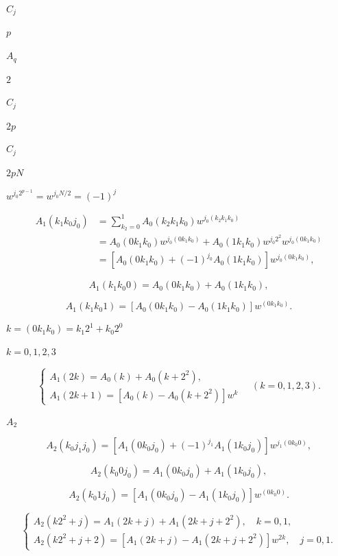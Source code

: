 \documentclass[UTF8,fontset=fandol,a4paper]{ctexart}
\begin{document}
\noindent $C_j$\par

\noindent $p$\par

\noindent $A_q$\par

\noindent $2$\par

\noindent $C_j$\par

\noindent $2p$\par

\noindent $C_j$\par

\noindent $2pN$\par

\noindent $w^{j_0 2^{p-1}}=w^{j_0N/2}=(-1)^j$\par

\[
\begin{aligned}
A_1(k_1k_0j_0)&=\sum_{k_2=0}^1A_0(k_2k_1k_0)w^{j_0(k_2k_1k_0)}\\
&=A_0(0k_1k_0)w^{j_0(0k_1k_0)}+A_0(1k_1k_0)w^{j_0 2^2}w^{j_0(0k_1k_0)}\\
&=[A_0(0k_1k_0)+(-1)^{j_0}A_0(1k_1k_0)]w^{j_0(0k_1k_0)},
\end{aligned}
\]

\[
A_1(k_1k_0 0)=A_0(0k_1k_0)+A_0(1k_1k_0),
\]

\[
A_1(k_1k_0 1)=[A_0(0k_1k_0)-A_0(1k_1k_0)]w^{(0k_1k_0)}.
\]

\noindent $k=(0k_1k_0)=k_1 2^1+k_0 2^0$\par

\noindent $k=0,1,2,3$\par

\[
\begin{cases}
A_1(2k)=A_0(k)+A_0(k+2^2),\\
A_1(2k+1)=[A_0(k)-A_0(k+2^2)]w^k
\end{cases}\quad(k=0,1,2,3).\tag{3.7.13}
\]

\noindent $A_2$\par

\[
A_2(k_0j_1j_0)=[A_1(0k_0j_0)+(-1)^{j_1}A_1(1k_0j_0)]w^{j_1(0k_0 0)},
\]

\[
A_2(k_0 0j_0)=A_1(0k_0j_0)+A_1(1k_0j_0),
\]

\[
A_2(k_0 1j_0)=[A_1(0k_0j_0)-A_1(1k_0j_0)]w^{(0k_0 0)}.
\]

\[
\begin{cases}
A_2(k2^2+j)=A_1(2k+j)+A_1(2k+j+2^2),\quad k=0,1,\\
A_2(k2^2+j+2)=[A_1(2k+j)-A_1(2k+j+2^2)]w^{2k},\quad j=0,1.
\end{cases}\tag{3.7.14}
\]
\end{document}

